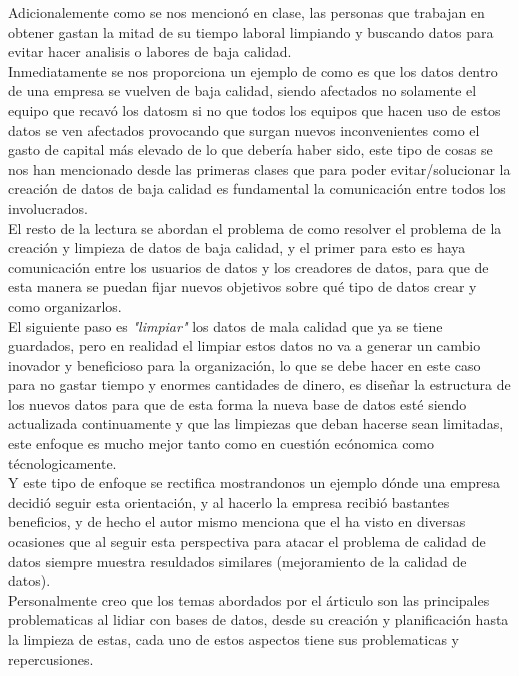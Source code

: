 \documentclass{article}
\begin{document}
Adicionalemente como se nos mencionó en clase, las personas que trabajan en obtener gastan la mitad de su tiempo laboral limpiando y buscando datos
 para evitar hacer analisis o labores de baja calidad.
\\

Inmediatamente se nos proporciona un ejemplo de como es que los datos dentro de una empresa se vuelven de baja calidad, siendo afectados no 
solamente el equipo que recavó los datosm si no que todos los equipos que hacen uso de estos datos se ven afectados provocando que surgan nuevos
 inconvenientes como el gasto de capital más elevado de lo que debería haber sido, este tipo de cosas se nos han mencionado desde las primeras 
 clases que para poder evitar/solucionar la creación de datos de baja calidad es fundamental la comunicación entre todos los involucrados.
\\

El resto de la lectura se abordan el problema de como resolver el problema de la creación y limpieza de datos de baja calidad, y el primer para 
esto es haya comunicación entre los usuarios de datos y los creadores de datos, para que de esta manera se puedan fijar nuevos objetivos sobre 
qué tipo de datos crear y como organizarlos.\\

El siguiente paso es \textit{"limpiar" } los datos de mala calidad que ya se tiene guardados, pero en realidad el limpiar estos datos no va a 
generar un cambio inovador y beneficioso para la organización, lo que se debe hacer en este caso para no gastar tiempo y enormes cantidades de 
dinero, es diseñar la estructura de los nuevos datos para que de esta forma la nueva base de datos esté siendo actualizada continuamente y que 
las limpiezas que deban hacerse sean limitadas, este enfoque es mucho mejor tanto como en cuestión ecónomica como técnologicamente.
\\

Y este tipo de enfoque se rectifica mostrandonos un ejemplo dónde una empresa decidió seguir esta orientación, y al hacerlo la empresa recibió 
bastantes beneficios, y de hecho el autor mismo menciona que el ha visto en diversas ocasiones que al seguir esta perspectiva para atacar el 
problema de calidad de datos siempre muestra resuldados similares (mejoramiento de la calidad de datos).
\\

Personalmente creo que los temas abordados por el árticulo son las principales problematicas al lidiar con bases de datos, desde su creación y 
planificación hasta la limpieza de estas, cada uno de estos aspectos tiene sus problematicas y repercusiones.\\
\end{document}
